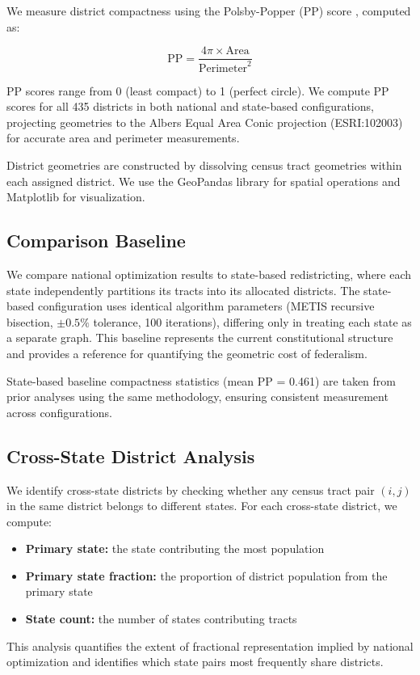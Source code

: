 We measure district compactness using the Polsby-Popper (PP) score \citep{polsby1991third}, computed as:

\begin{equation}
\text{PP} = \frac{4\pi \times \text{Area}}{\text{Perimeter}^2}
\end{equation}

PP scores range from 0 (least compact) to 1 (perfect circle). We compute PP scores for all 435 districts in both national and state-based configurations, projecting geometries to the Albers Equal Area Conic projection (ESRI:102003) for accurate area and perimeter measurements.

District geometries are constructed by dissolving census tract geometries within each assigned district. We use the GeoPandas library \citep{geopandas} for spatial operations and Matplotlib for visualization.

\subsection{Comparison Baseline}

We compare national optimization results to state-based redistricting, where each state independently partitions its tracts into its allocated districts. The state-based configuration uses identical algorithm parameters (METIS recursive bisection, $ \pm 0.5\% $ tolerance, 100 iterations), differing only in treating each state as a separate graph. This baseline represents the current constitutional structure and provides a reference for quantifying the geometric cost of federalism.

State-based baseline compactness statistics (mean PP = 0.461) are taken from prior analyses using the same methodology, ensuring consistent measurement across configurations.

\subsection{Cross-State District Analysis}

We identify cross-state districts by checking whether any census tract pair $ (i,j) $ in the same district belongs to different states. For each cross-state district, we compute:
\begin{itemize}
    \item \textbf{Primary state:} the state contributing the most population
    \item \textbf{Primary state fraction:} the proportion of district population from the primary state
    \item \textbf{State count:} the number of states contributing tracts
\end{itemize}

This analysis quantifies the extent of fractional representation implied by national optimization and identifies which state pairs most frequently share districts.

